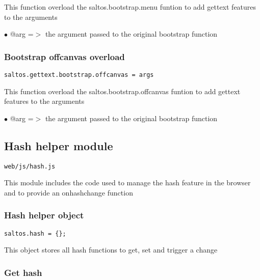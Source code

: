 \documentclass[a4paper]{article}
\begin{document}
This function overload the saltos.bootstrap.menu funtion to add gettext
features to the arguments

\begin{compactitem}
\item[\color{myblue}$\bullet$] @arg =$>$ the argument passed to the original bootstrap function
\end{compactitem}

\hypertarget{toc806}{}
\subsubsection{Bootstrap offcanvas overload}

\begin{lstlisting}
saltos.gettext.bootstrap.offcanvas = args
\end{lstlisting}

This function overload the saltos.bootstrap.offcanvas funtion to add gettext
features to the arguments

\begin{compactitem}
\item[\color{myblue}$\bullet$] @arg =$>$ the argument passed to the original bootstrap function
\end{compactitem}

\hypertarget{toc807}{}
\subsection{Hash helper module}

\begin{lstlisting}
web/js/hash.js
\end{lstlisting}

This module includes the code used to manage the hash feature in the browser
and to provide an onhashchange function

\hypertarget{toc808}{}
\subsubsection{Hash helper object}

\begin{lstlisting}
saltos.hash = {};
\end{lstlisting}

This object stores all hash functions to get, set and trigger a change

\hypertarget{toc809}{}
\subsubsection{Get hash}
\end{document}
